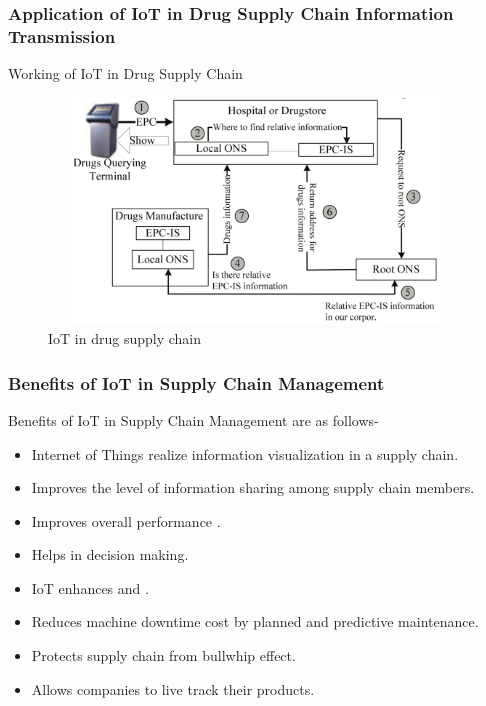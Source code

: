 \documentclass{beamer}
\begin{document}
\begin{frame}
\frametitle{Application of IoT in Drug Supply Chain Information Transmission}
\begin{block}{Working of IoT in Drug Supply Chain}
\begin{figure}
\centering
\includegraphics[width=11cm,height=6cm]{drug}
\caption{IoT in drug supply chain\cite{yan2009supply}}
\end{figure}
\end{block}
\end{frame}



\begin{frame}
\frametitle{Benefits of IoT in Supply Chain Management}
\begin{block}{Benefits of IoT in Supply Chain Management are as follows-}
\begin{itemize}
	\item Internet of Things realize information visualization in a supply chain.
    \item Improves the level of information sharing among supply chain members.
    \item  Improves overall performance .
    \item Helps in decision making.
    \item IoT enhances   and .
    \item Reduces machine downtime cost by planned and predictive maintenance. 
    \item Protects supply chain from bullwhip effect.
    \item Allows companies to live track their products.
\end{itemize}
\end{block}
\end{frame}
\end{document}
